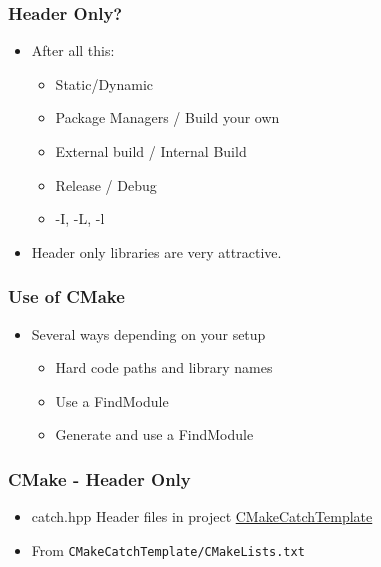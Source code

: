 \subsubsection{Header Only?}\label{header-only}

\begin{itemize}
\itemsep1pt\parskip0pt
\item
  After all this:

  \begin{itemize}
  \itemsep1pt\parskip0pt
  \item
    Static/Dynamic
  \item
    Package Managers / Build your own
  \item
    External build / Internal Build
  \item
    Release / Debug
  \item
    -I, -L, -l
  \end{itemize}
\item
  Header only libraries are very attractive.
\end{itemize}

\subsubsection{Use of CMake}\label{use-of-cmake}

\begin{itemize}
\itemsep1pt\parskip0pt
\item
  Several ways depending on your setup

  \begin{itemize}
  \itemsep1pt\parskip0pt
  \item
    Hard code paths and library names
  \item
    Use a FindModule
  \item
    Generate and use a FindModule
  \end{itemize}
\end{itemize}

\subsubsection{CMake - Header Only}\label{cmake---header-only}

\begin{itemize}
\itemsep1pt\parskip0pt
\item
  catch.hpp Header files in project
  \href{https://github.com/MattClarkson/CMakeCatchTemplate/blob/master/Testing/mpBasicTest.cpp}{CMakeCatchTemplate}
\item
  From \texttt{CMakeCatchTemplate/CMakeLists.txt}
\end{itemize}

